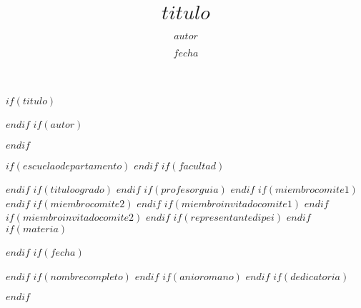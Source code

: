 \documentclass[12pt,reqno,oneside,pdftex]{puctesis} %
\begin{document}


$if(titulo)$
\title{$titulo$}
$endif$
$if(autor)$
\author{$autor$}
$endif$

$if(escuelaodepartamento)$
$endif$
$if(facultad)$
\address{$facultad$\\
         Pontificia Universidad Cat\'olica de Chile\\ 
         Vicu\~na Mackenna 4860\\
         Santiago, Chile\\
         {\it Tel.\/} : 56 (2) 354-2000}
$endif$
$if(tituloogrado)$
$endif$
$if(profesorguia)$
$endif$
$if(miembrocomite1)$
$endif$
$if(miembrocomite2)$
$endif$
$if(miembroinvitadocomite1)$
$endif$
$if(miembroinvitadocomite2)$
$endif$
$if(representantedipei)$
$endif$
$if(materia)$
\subject      {$materia$}
$endif$
$if(fecha)$
\date         {$fecha$}
$endif$
$if(nombrecompleto)$
$endif$
$if(anioromano)$
$endif$
$if(dedicatoria)$
\dedication   {$dedicatoria$}
$endif$


\PageNumbersFootCentered       %
\maketitle
\end{document}
